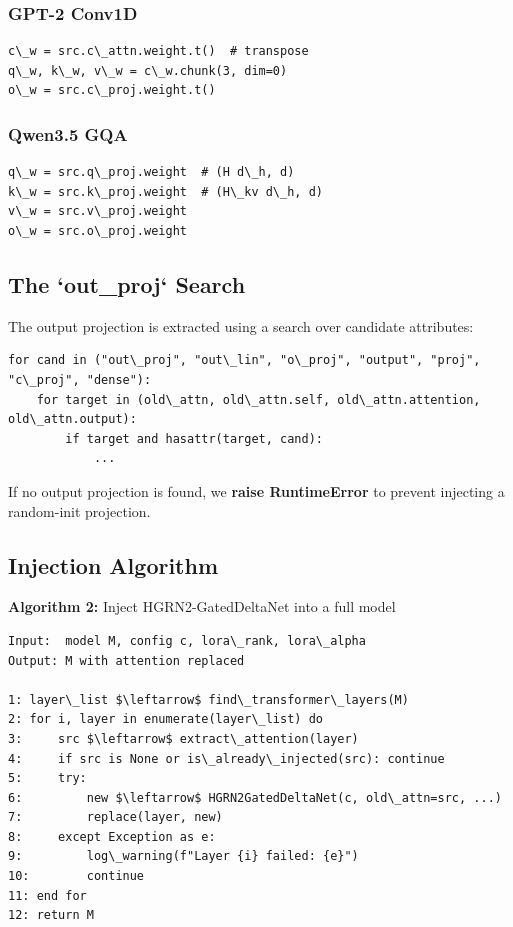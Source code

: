 \subsubsection{GPT-2 Conv1D}

\begin{lstlisting}
c\_w = src.c\_attn.weight.t()  # transpose
q\_w, k\_w, v\_w = c\_w.chunk(3, dim=0)
o\_w = src.c\_proj.weight.t()
\end{lstlisting}

\subsubsection{Qwen3.5 GQA}

\begin{lstlisting}
q\_w = src.q\_proj.weight  # (H d\_h, d)
k\_w = src.k\_proj.weight  # (H\_kv d\_h, d)
v\_w = src.v\_proj.weight
o\_w = src.o\_proj.weight
\end{lstlisting}

\subsection{The `out\_proj` Search}

The output projection is extracted using a search over candidate attributes:

\begin{lstlisting}
for cand in ("out\_proj", "out\_lin", "o\_proj", "output", "proj", "c\_proj", "dense"):
    for target in (old\_attn, old\_attn.self, old\_attn.attention, old\_attn.output):
        if target and hasattr(target, cand):
            ...
\end{lstlisting}

If no output projection is found, we \textbf{raise RuntimeError} to prevent 
injecting a random-init projection.

\subsection{Injection Algorithm}

\textbf{Algorithm 2:} Inject HGRN2-GatedDeltaNet into a full model
\begin{lstlisting}
Input:  model M, config c, lora\_rank, lora\_alpha
Output: M with attention replaced

1: layer\_list $\leftarrow$ find\_transformer\_layers(M)
2: for i, layer in enumerate(layer\_list) do
3:     src $\leftarrow$ extract\_attention(layer)
4:     if src is None or is\_already\_injected(src): continue
5:     try:
6:         new $\leftarrow$ HGRN2GatedDeltaNet(c, old\_attn=src, ...)
7:         replace(layer, new)
8:     except Exception as e:
9:         log\_warning(f"Layer {i} failed: {e}")
10:        continue
11: end for
12: return M
\end{lstlisting}

